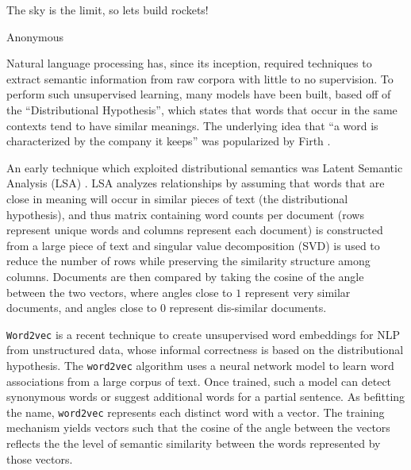 \documentclass[11pt]{book}
\newcommand{\citep}[1]{\cite{#1}}
\begin{document}
\epigraph{The sky is the limit, so lets build rockets!}{Anonymous}



Natural language processing has, since its inception, required
techniques to extract semantic information from raw corpora with little to no
supervision. To perform such unsupervised learning, many models
have been built, based off of the ``Distributional Hypothesis'', which states
that words that occur in the same contexts tend to have similar meanings.
The
underlying idea that ``a word is characterized by the company it keeps'' was
popularized by Firth \citep{firth1957synopsis}.

An early technique which exploited distributional semantics was Latent Semantic
Analysis (LSA) \cite{landauer1998introduction}. LSA analyzes relationships by
assuming that words that are close in meaning will occur in similar pieces of
text (the distributional hypothesis), and thus matrix containing word counts
per document (rows represent unique words and columns represent each document)
is constructed from a large piece of text and  singular value decomposition
(SVD) is used to reduce the number of rows while preserving the similarity
structure among columns. Documents are then compared by taking the cosine of
the angle between the two vectors, where angles close to $1$ represent very
similar documents, and angles close to $0$ represent dis-similar documents.

\texttt{Word2vec} is a recent technique to create unsupervised word embeddings
for NLP from unstructured data, whose informal correctness is based on the
distributional hypothesis. 
The \texttt{word2vec} algorithm uses a neural network 
model to learn word associations from a large corpus of text. Once trained,
such a model can detect synonymous words or suggest additional words for a
partial sentence.  As befitting the name, \texttt{word2vec} represents each
distinct word with a vector. 
The training mechanism yields vectors such that
the cosine of the angle between the vectors reflects the the level of semantic
similarity between the words represented by those vectors.
\end{document}
